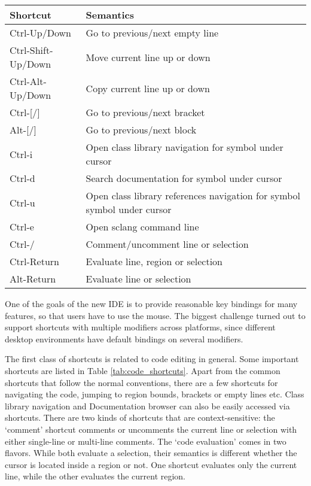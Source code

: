\documentclass[11pt,a4paper]{article}
\begin{document}
\begin{table*}[t]
\begin{tabular}{  l  l  }
  \toprule
  Shortcut & Semantics \\
  \midrule
  Ctrl-Up/Down & Go to previous/next empty line \\
  Ctrl-Shift-Up/Down & Move current line up or down \\
  Ctrl-Alt-Up/Down & Copy current line up or down \\
  Ctrl-[/] & Go to previous/next bracket \\
  Alt-[/] & Go to previous/next block \\

  Ctrl-i & Open class library navigation for symbol under cursor \\
  Ctrl-d & Search documentation for symbol under cursor \\
  Ctrl-u & Open class library references navigation for symbol symbol under cursor \\
  Ctrl-e & Open sclang command line \\

  Ctrl-/ & Comment/uncomment line or selection \\
  Ctrl-Return & Evaluate line, region or selection \\
  Alt-Return & Evaluate line or selection \\

  \bottomrule
\end{tabular}
\caption{Code-editing Shortcuts}
\label{tab:code_shortcuts}
\end{table*}

One of the goals of the new IDE is to provide reasonable key bindings for many features, so that users have to use the
mouse. The biggest challenge turned out to support shortcuts with multiple modifiers across platforms, since different
desktop environments have default bindings on several modifiers.

The first class of shortcuts is related to code editing in general. Some important shortcuts are listed in Table
\ref{tab:code_shortcuts}. Apart from the common shortcuts that follow the normal conventions, there are a few shortcuts
for navigating the code, jumping to region bounds, brackets or empty lines etc. Class library navigation and
Documentation browser can also be easily accessed via shortcuts. There are two kinds of shortcuts that are
context-sensitive: the `comment' shortcut comments or uncomments the current line or selection with either single-line
or multi-line comments. The `code evaluation' comes in two flavors. While both evaluate a selection, their semantics is
different whether the cursor is located inside a region or not. One shortcut evaluates only the current line, while the
other evaluates the current region.
\end{document}

